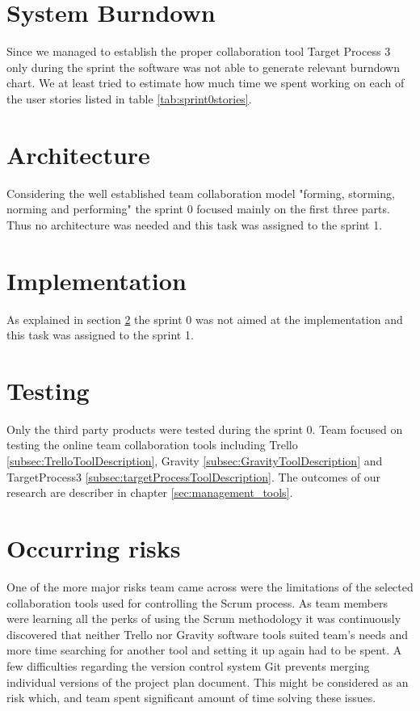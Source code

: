\section{System Burndown}
Since we managed to establish the proper collaboration tool Target Process 3 only during the sprint the software was not able to generate relevant burndown chart.
We at least tried to estimate how much time we spent working on each of the user stories listed in table \ref{tab:sprint0stories}.

\section{Architecture} \label{txt:sprint0architecture}

Considering the well established team collaboration model "forming, storming, norming and performing" the sprint 0 focused mainly on the first three parts.
Thus no architecture was needed and this task was assigned to the sprint 1.

\section{Implementation}

As explained in section \ref{txt:sprint0architecture} the sprint 0 was not aimed at the implementation and this task was assigned to the sprint 1.

\section{Testing}

Only the third party products were tested during the sprint 0. Team focused on testing the online team collaboration tools including Trello \ref{subsec:TrelloToolDescription}, Gravity \ref{subsec:GravityToolDescription} and TargetProcess3 \ref{subsec:targetProcessToolDescription}. The outcomes of our research are describer in chapter \ref{sec:management_tools}.

\section{Occurring risks}

One of the more major risks team came across were the limitations of the selected collaboration tools used for controlling the Scrum process. As team members were learning all the perks of using the Scrum methodology it was continuously discovered that neither Trello nor Gravity software tools suited team's needs and more time searching for another tool and setting it up again had to be spent. A few difficulties regarding the version control system Git prevents merging individual versions of the project plan document. This might be considered as an risk which, and team spent significant amount of time solving these issues.

